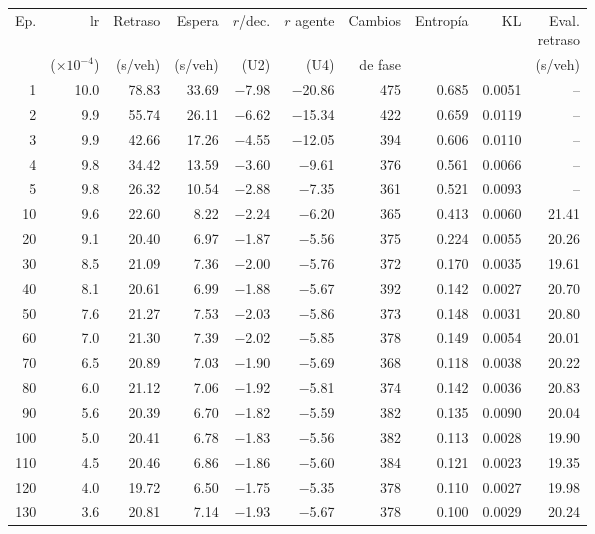 \begin{table}[H]
\centering
\scriptsize
\setlength{\tabcolsep}{3pt}
\setlength{\tabcolsep}{2pt}
\begin{tabular}{rrrrrrrrrr}
\toprule
Ep. & lr & Retraso & Espera & $r$/dec. & $r$ agente & Cambios & Entropía & KL & \makecell{Eval.\\retraso} \\
 & ($\times 10^{-4}$) & (s/veh) & (s/veh) & (U2) & (U4) & de fase &  &  & (s/veh) \\
\midrule
1 & 10.0 & 78.83 & 33.69 & $-$7.98 & $-$20.86 & 475 & 0.685 & 0.0051 & -- \\
2 & 9.9 & 55.74 & 26.11 & $-$6.62 & $-$15.34 & 422 & 0.659 & 0.0119 & -- \\
3 & 9.9 & 42.66 & 17.26 & $-$4.55 & $-$12.05 & 394 & 0.606 & 0.0110 & -- \\
4 & 9.8 & 34.42 & 13.59 & $-$3.60 & $-$9.61 & 376 & 0.561 & 0.0066 & -- \\
5 & 9.8 & 26.32 & 10.54 & $-$2.88 & $-$7.35 & 361 & 0.521 & 0.0093 & -- \\
10 & 9.6 & 22.60 & 8.22 & $-$2.24 & $-$6.20 & 365 & 0.413 & 0.0060 & 21.41 \\
20 & 9.1 & 20.40 & 6.97 & $-$1.87 & $-$5.56 & 375 & 0.224 & 0.0055 & 20.26 \\
30 & 8.5 & 21.09 & 7.36 & $-$2.00 & $-$5.76 & 372 & 0.170 & 0.0035 & 19.61 \\
40 & 8.1 & 20.61 & 6.99 & $-$1.88 & $-$5.67 & 392 & 0.142 & 0.0027 & 20.70 \\
50 & 7.6 & 21.27 & 7.53 & $-$2.03 & $-$5.86 & 373 & 0.148 & 0.0031 & 20.80 \\
60 & 7.0 & 21.30 & 7.39 & $-$2.02 & $-$5.85 & 378 & 0.149 & 0.0054 & 20.01 \\
70 & 6.5 & 20.89 & 7.03 & $-$1.90 & $-$5.69 & 368 & 0.118 & 0.0038 & 20.22 \\
80 & 6.0 & 21.12 & 7.06 & $-$1.92 & $-$5.81 & 374 & 0.142 & 0.0036 & 20.83 \\
90 & 5.6 & 20.39 & 6.70 & $-$1.82 & $-$5.59 & 382 & 0.135 & 0.0090 & 20.04 \\
100 & 5.0 & 20.41 & 6.78 & $-$1.83 & $-$5.56 & 382 & 0.113 & 0.0028 & 19.90 \\
110 & 4.5 & 20.46 & 6.86 & $-$1.86 & $-$5.60 & 384 & 0.121 & 0.0023 & 19.35 \\
120 & 4.0 & 19.72 & 6.50 & $-$1.75 & $-$5.35 & 378 & 0.110 & 0.0027 & 19.98 \\
130 & 3.6 & 20.81 & 7.14 & $-$1.93 & $-$5.67 & 378 & 0.100 & 0.0029 & 20.24 \\

\end{tabular}
\end{table}
